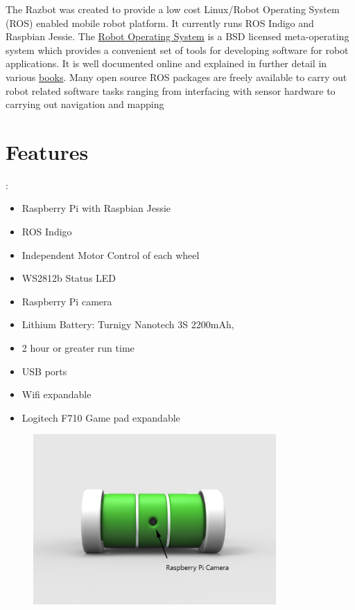 \documentclass[12pt,titlepage,oneside]{memoir}
\begin{document}
The Razbot was created to provide a low cost Linux/Robot Operating System (ROS) enabled mobile robot platform. It currently runs ROS Indigo and Raspbian Jessie. The \href{http://wiki.ros.org/ROS/Introduction}{Robot Operating System} is a BSD licensed meta-operating system which provides a convenient set of tools for developing software for robot applications. It is well documented online and explained in further detail in various \href{http://wiki.ros.org/Books}{books}. Many open source ROS packages are freely available to carry out robot related software tasks ranging from interfacing with sensor hardware to carrying out navigation and mapping \\



\section{Features}:
\begin{itemize}
\item Raspberry Pi with Raspbian Jessie
\item ROS Indigo
\item Independent Motor Control of each wheel
\item WS2812b Status LED
\item Raspberry Pi camera
\item Lithium Battery: Turnigy Nanotech 3S 2200mAh,
\item 2 hour or greater run time
\item USB ports
\item Wifi expandable
\item Logitech F710 Game pad expandable
\end{itemize}

\pagebreak
\begin{figure}[!htbp]
\includegraphics[width=350px]{render/pibotfront.jpg}
\centering
\end{figure}
\end{document}
